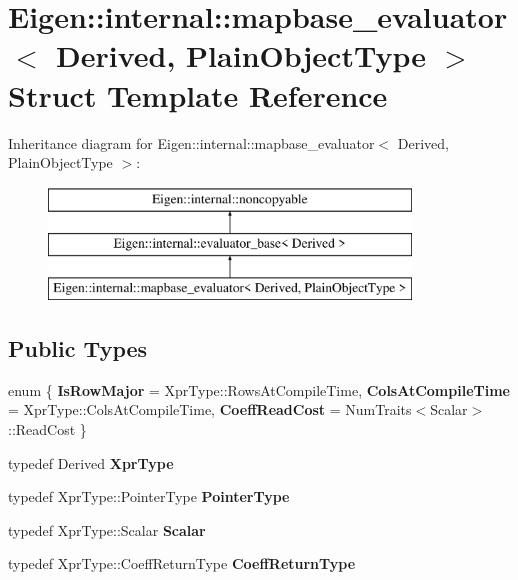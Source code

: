 \hypertarget{struct_eigen_1_1internal_1_1mapbase__evaluator}{}\section{Eigen\+::internal\+::mapbase\+\_\+evaluator$<$ Derived, Plain\+Object\+Type $>$ Struct Template Reference}
\label{struct_eigen_1_1internal_1_1mapbase__evaluator}
Inheritance diagram for Eigen\+::internal\+::mapbase\+\_\+evaluator$<$ Derived, Plain\+Object\+Type $>$\+:\begin{figure}[H]
\begin{center}
\leavevmode
\includegraphics[height=3.000000cm]{struct_eigen_1_1internal_1_1mapbase__evaluator}
\end{center}
\end{figure}
\subsection*{Public Types}
\begin{DoxyCompactItemize}
\item 
\mbox{\label{struct_eigen_1_1internal_1_1mapbase__evaluator_a4693aaf4785e3290fcb5d7df5ae4fdd7}} 
enum \{ {\bfseries Is\+Row\+Major} = Xpr\+Type\+::Rows\+At\+Compile\+Time, 
{\bfseries Cols\+At\+Compile\+Time} = Xpr\+Type\+::Cols\+At\+Compile\+Time, 
{\bfseries Coeff\+Read\+Cost} = Num\+Traits$<$Scalar$>$\+::Read\+Cost
 \}
\item 
\mbox{\label{struct_eigen_1_1internal_1_1mapbase__evaluator_afba84e56a1b0084898f7558ab110837c}} 
typedef Derived {\bfseries Xpr\+Type}
\item 
\mbox{\label{struct_eigen_1_1internal_1_1mapbase__evaluator_a70ec31b534c7d98abad460b037be78a4}} 
typedef Xpr\+Type\+::\+Pointer\+Type {\bfseries Pointer\+Type}
\item 
\mbox{\label{struct_eigen_1_1internal_1_1mapbase__evaluator_a6ed4dac31c67f289147e3136e51f4284}} 
typedef Xpr\+Type\+::\+Scalar {\bfseries Scalar}
\item 
\mbox{\label{struct_eigen_1_1internal_1_1mapbase__evaluator_a8ecbb62e5ec7872f86b2a1ea087358ca}} 
typedef Xpr\+Type\+::\+Coeff\+Return\+Type {\bfseries Coeff\+Return\+Type}
\end{DoxyCompactItemize}
